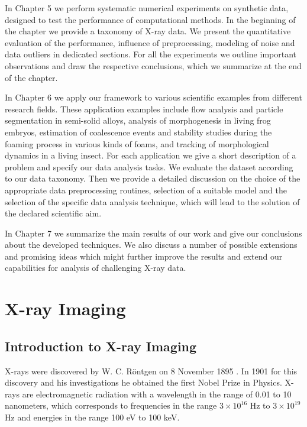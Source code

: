 
In Chapter 5 we perform  systematic numerical experiments on synthetic data, designed to test the performance of computational methods.  In the beginning of the chapter we provide a taxonomy of X-ray data. We present the quantitative evaluation of the performance, influence of preprocessing, modeling of noise and data outliers in dedicated sections. For all the experiments we outline important observations and draw the respective conclusions, which we summarize at the end of the chapter.

In Chapter 6 we apply our framework to various scientific examples from different research fields. These application examples include flow analysis and particle segmentation in semi-solid alloys, analysis of morphogenesis in living frog embryos, estimation of coalescence events and stability studies during the foaming process in various kinds of foams, and tracking of morphological dynamics in a living insect.
For each application we give a short description of a problem and specify our data analysis tasks. We evaluate the dataset according to our data taxonomy. Then we provide a detailed discussion on the choice of the appropriate data preprocessing  routines, selection of a suitable \opticalflow model and the selection of the specific data analysis technique, which will lead to the solution of the declared scientific aim.

In Chapter 7 we summarize the main results of our work and give our conclusions about the developed techniques. We also discuss a number of possible extensions and promising ideas which might further improve the results and extend our capabilities for analysis of challenging X-ray data.  




\section{X-ray Imaging}

\subsection{Introduction to X-ray Imaging}

X-rays were discovered by W. C. R\"ontgen on 8 November 1895 \cite{Roentgen1896}. In 1901 for this discovery and his investigations he obtained the first Nobel Prize in Physics. X-rays are electromagnetic radiation with a wavelength in the range of 0.01 to 10 nanometers, which corresponds to frequencies in the range $3 \times 10^{16}$ Hz to $3 \times 10^{19}$ Hz and energies in the range 100 eV to 100 keV. 

